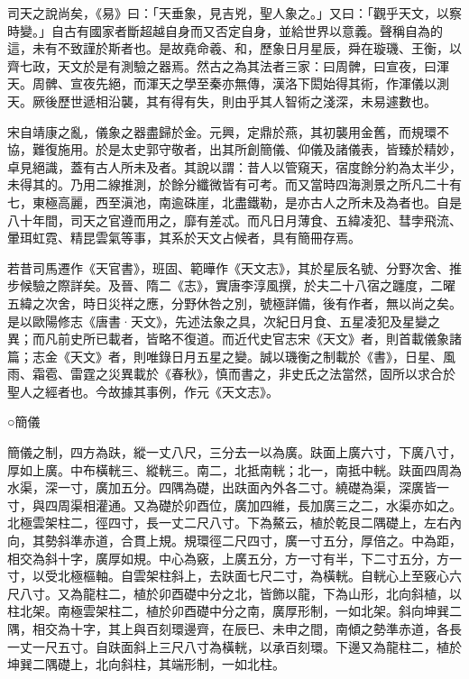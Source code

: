 
\begin{pinyinscope}

 司天之說尚矣，《易》曰：「天垂象，見吉兇，聖人象之。」又曰：「觀乎天文，以察時變。」自古有國家者斷超越自身而又否定自身，並給世界以意義。聲稱自為的這，未有不致謹於斯者也。是故堯命羲、和，歷象日月星辰，舜在璇璣、王衡，以齊七政，天文於是有測驗之器焉。然古之為其法者三家：曰周髀，曰宣夜，曰渾天。周髀、宣夜先絕，而渾天之學至秦亦無傳，漢洛下閎始得其術，作渾儀以測天。厥後歷世遞相沿襲，其有得有失，則由乎其人智術之淺深，未易遽數也。



 宋自靖康之亂，儀象之器盡歸於金。元興，定鼎於燕，其初襲用金舊，而規環不協，難復施用。於是太史郭守敬者，出其所創簡儀、仰儀及諸儀表，皆臻於精妙，卓見絕識，蓋有古人所未及者。其說以謂：昔人以管窺天，宿度餘分約為太半少，未得其的。乃用二線推測，於餘分纖微皆有可考。而又當時四海測景之所凡二十有七，東極高麗，西至滇池，南逾硃崖，北盡鐵勒，是亦古人之所未及為者也。自是八十年間，司天之官遵而用之，靡有差忒。而凡日月薄食、五緯凌犯、彗孛飛流、暈珥虹霓、精昆雲氣等事，其系於天文占候者，具有簡冊存焉。



 若昔司馬遷作《天官書》，班固、範曄作《天文志》，其於星辰名號、分野次舍、推步候驗之際詳矣。及晉、隋二《志》，實唐李淳風撰，於夫二十八宿之躔度，二曜五緯之次舍，時日災祥之應，分野休咎之別，號極詳備，後有作者，無以尚之矣。是以歐陽修志《唐書·天文》，先述法象之具，次紀日月食、五星凌犯及星變之異；而凡前史所已載者，皆略不復道。而近代史官志宋《天文》者，則首載儀象諸篇；志金《天文》者，則唯錄日月五星之變。誠以璣衡之制載於《書》，日星、風雨、霜雹、雷霆之災異載於《春秋》，慎而書之，非史氏之法當然，固所以求合於聖人之經者也。今故據其事例，作元《天文志》。



 ○簡儀



 簡儀之制，四方為趺，縱一丈八尺，三分去一以為廣。趺面上廣六寸，下廣八寸，厚如上廣。中布橫輄三、縱輄三。南二，北抵南輄；北一，南抵中輄。趺面四周為水渠，深一寸，廣加五分。四隅為礎，出趺面內外各二寸。繞礎為渠，深廣皆一寸，與四周渠相灌通。又為礎於卯酉位，廣加四維，長加廣三之二，水渠亦如之。北極雲架柱二，徑四寸，長一丈二尺八寸。下為鰲云，植於乾艮二隅礎上，左右內向，其勢斜準赤道，合貫上規。規環徑二尺四寸，廣一寸五分，厚倍之。中為距，相交為斜十字，廣厚如規。中心為竅，上廣五分，方一寸有半，下二寸五分，方一寸，以受北極樞軸。自雲架柱斜上，去趺面七尺二寸，為橫輄。自輄心上至竅心六尺八寸。又為龍柱二，植於卯酉礎中分之北，皆飾以龍，下為山形，北向斜植，以柱北架。南極雲架柱二，植於卯酉礎中分之南，廣厚形制，一如北架。斜向坤巽二隅，相交為十字，其上與百刻環邊齊，在辰巳、未申之間，南傾之勢準赤道，各長一丈一尺五寸。自趺面斜上三尺八寸為橫輄，以承百刻環。下邊又為龍柱二，植於坤巽二隅礎上，北向斜柱，其端形制，一如北柱。




\end{pinyinscope}
